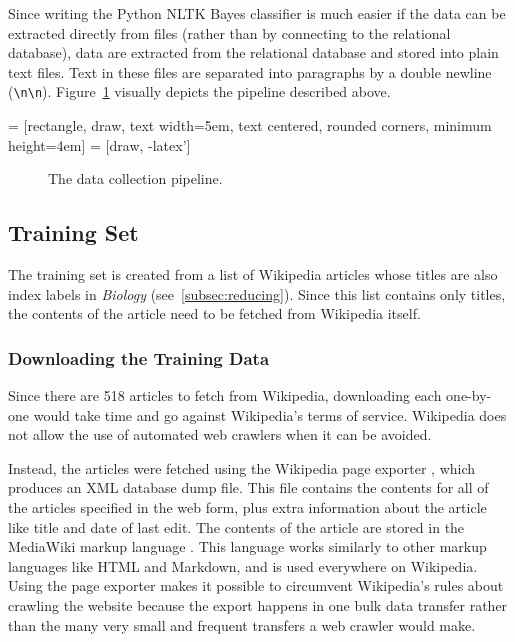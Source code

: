 \noindent Since writing the Python NLTK \naive Bayes classifier is much easier if the data can be extracted directly from files (rather than by connecting to the relational database), data are extracted from the relational database and stored into plain text files.
Text in these files are separated into paragraphs by a double newline ({\tt \textbackslash n\textbackslash n}).
Figure~\ref{fig:pipeline} visually depicts the pipeline described above.

 = [rectangle, draw, 
    text width=5em, text centered, rounded corners, minimum height=4em]
 = [draw, -latex']

\begin{figure}[H]
\begin{center}
\caption{The data collection pipeline.}
\label{fig:pipeline}
\end{center}
\end{figure}

\subsection{Training Set}
\label{subsec:training-set}

The training set is created from a list of Wikipedia articles whose titles are also index labels in {\it Biology} (see~\ref{subsec:reducing}).
Since this list contains only titles, the contents of the article need to be fetched from Wikipedia itself.

\subsubsection{Downloading the Training Data}

Since there are 518 articles to fetch from Wikipedia, downloading each one-by-one would take time and go against Wikipedia's terms of service. Wikipedia does not allow the use of automated web crawlers when it can be avoided\cite{wiki-robots}.

Instead, the articles were fetched using the Wikipedia page exporter \cite{wiki-exporter}, which produces an XML database dump file.
This file contains the contents for all of the articles specified in the web form, plus extra information about the article like title and date of last edit.
The contents of the article are stored in the MediaWiki markup language \cite{mediawiki-markup}.
This language works similarly to other markup languages like HTML and Markdown, and is used everywhere on Wikipedia.
Using the page exporter makes it possible to circumvent Wikipedia's rules about crawling the website because the export happens in one bulk data transfer rather than the many very small and frequent transfers a web crawler would make.

